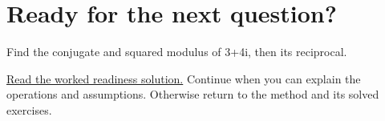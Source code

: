 \section*{Ready for the next question?}
\label{readiness:complex_numbers}
Find the conjugate and squared modulus of 3+4i, then its reciprocal.
\par\hyperref[solution:ready:complex_numbers]{Read the worked readiness solution.} Continue when you can explain the operations and assumptions. Otherwise return to the method and its solved exercises.
